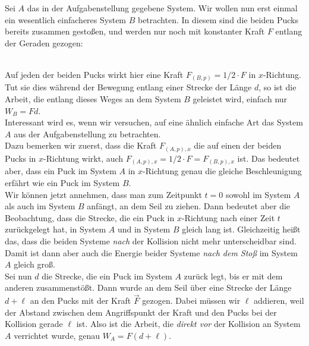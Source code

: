 \begin{Answer}[ref = pucks]
	Sei $A$ das in der Aufgabenstellung gegebene System. Wir wollen nun erst einmal ein wesentlich einfacheres System $B$ betrachten. In diesem sind die beiden Pucks bereits zusammen gestoßen, und werden nur noch mit konstanter Kraft $F$ entlang der Geraden gezogen:
	\begin{figure}[h]
		\centering
	\end{figure}\\
Auf jeden der beiden Pucks wirkt hier eine Kraft $F_{(B,p)} = 1/2\cdot F$ in $x$-Richtung.\\ 
Tut sie dies während der Bewegung entlang einer Strecke der Länge $d$, so ist die Arbeit, die entlang dieses Weges an dem System $B$ geleistet wird, einfach nur $W_B = Fd$.\\
Interessant wird es, wenn wir versuchen,  auf eine ähnlich einfache Art das System $A$ aus der Aufgabenstellung zu betrachten.\\
Dazu bemerken wir zuerst, dass die Kraft $F_{(A,p),x}$ die auf einen der beiden Pucks in $x$-Richtung wirkt, auch $F_{(A,p),x} = 1/2\cdot F = F_{(B,p),x}$ ist. Das bedeutet aber, dass ein Puck im System $A$ in $x$-Richtung genau die gleiche Beschleunigung erfährt wie ein Puck im System $B$. \\
Wir können jetzt annehmen, dass man zum Zeitpunkt $t = 0$ sowohl im System $A$ als auch im System $B$ anfängt, an dem Seil zu ziehen. Dann bedeutet aber die Beobachtung, dass die Strecke, die ein Puck in $x$-Richtung nach einer Zeit $t$ zurückgelegt hat, in System $A$ und in System $B$ gleich lang ist. Gleichzeitig heißt das, dass die beiden Systeme \textit{nach} der Kollision nicht mehr unterscheidbar sind. Damit ist dann aber auch die Energie beider Systeme \textit{nach dem Stoß} im System $A$ gleich groß. \\
Sei nun $d$ die Strecke, die ein Puck im System $A$ zurück legt, bis er mit dem anderen zusammenstößt. Dann wurde an dem Seil über eine Strecke der Länge $d+\ell$ an den Pucks mit der Kraft $\vec{F}$ gezogen. Dabei müssen wir $\ell$ addieren, weil der Abstand zwischen dem Angriffspunkt der Kraft und den Pucks bei der Kollision gerade $\ell$ ist. Also ist die Arbeit, die \textit{direkt vor} der Kollision an System $A$ verrichtet wurde, genau $W_A = F(d+\ell)$.\\

\end{Answer}
